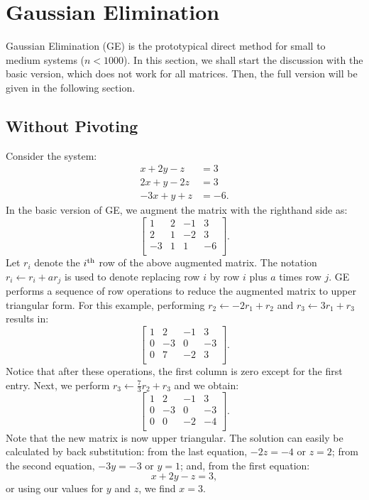\section{Gaussian Elimination}

Gaussian Elimination (GE) is the prototypical direct method for small to medium systems ($n<1000$). In this section, we shall start the discussion with the basic version, which does not work for all matrices. Then, the full version will be given in the following section.

\subsection{Without Pivoting}

\begin{example}
Consider the system:
\begin{align*}
x+2y-z & = 3\\
2x+y-2z & = 3\\
-3x+y+z & = -6.
\end{align*}
In the basic version of GE, we augment the matrix with the righthand side as:
\[
\begin{bmatrix}
1 & 2 & -1 & 3\\
2 & 1 & -2 & 3\\
-3 & 1 & 1 & -6\\
\end{bmatrix}.
\]
Let $r_i$ denote the $i^{\rm th}$ row of the above augmented matrix. The notation $r_i \leftarrow r_i + ar_j$ is used to denote replacing row $i$ by row $i$ plus $a$ times row $j$. GE performs a sequence of row operations to reduce the augmented matrix to upper triangular form. For this example, performing $r_2 \leftarrow -2r_1+r_2$ and $r_3\leftarrow 3r_1+r_3$ results in:
\[
\begin{bmatrix}
1 & 2 & -1 & 3\\
0 & -3 & 0 & -3\\
0 & 7 & -2 & 3\\
\end{bmatrix}.
\]
Notice that after these operations, the first column is zero except for the first entry. Next, we perform $r_3\leftarrow \tfrac{7}{3}r_2+r_3$ and we obtain:
\[
\begin{bmatrix}
1 & 2 & -1 & 3\\
0 & -3 & 0 & -3\\
0 & 0 & -2 & -4\\
\end{bmatrix}.
\]
Note that the new matrix is now upper triangular. The solution can easily be calculated by back substitution: from the last equation, $-2z=-4$ or $z=2$; from the second equation, $-3y=-3$ or $y=1$; and, from the first equation:
\[
x+2y-z=3,
\]
or using our values for $y$ and $z$, we find $x=3$.
\end{example}

